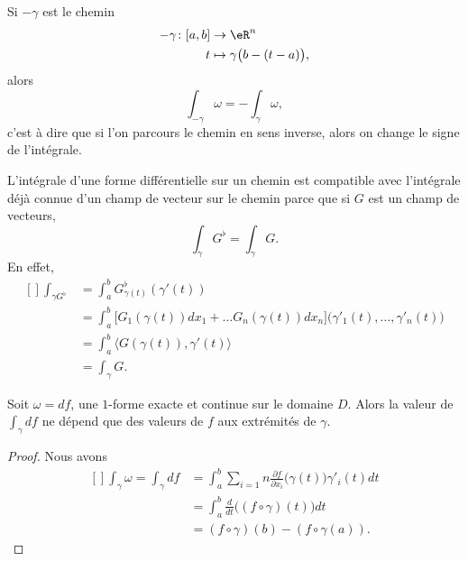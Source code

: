 \begin{remark}
	Si $-\gamma$ est le chemin
	\begin{equation}
		\begin{aligned}
			- \gamma\colon [a,b]&\to \eR^n \\
			t&\mapsto \gamma\big( b-(t-a) \big),
		\end{aligned}
	\end{equation}
	alors
	\begin{equation}
		\int_{-\gamma}\omega=-\int_{\gamma}\omega,
	\end{equation}
	c'est à dire que si l'on parcours le chemin en sens inverse, alors on change le signe de l'intégrale.
\end{remark}

L'intégrale d'une forme différentielle sur un chemin est compatible avec l'intégrale déjà connue d'un champ de vecteur sur le chemin parce que si $G$ est un champ de vecteurs,
\begin{equation}
	\int_{\gamma}G^{\flat}=\int_{\gamma}G.
\end{equation}
En effet,
\begin{equation}
	\begin{aligned}[]
		\int_{\gamma G^{\flat}}	&=\int_a^b G_{\gamma(t)}^{\flat}(\gamma'(t))\\
					&=\int_a^b\big[ G_1( \gamma(t) )dx_1+\ldots G_n(\gamma(t))dx_n \big]\big( \gamma'_1(t),\ldots,\gamma'_n(t) \big)\\
					&=\int_{a}^b\langle G(\gamma(t)), \gamma'(t)\rangle \\
					&=\int_{\gamma}G.
	\end{aligned}
\end{equation}


\begin{proposition}
	Soit $\omega=df$, une $1$-forme exacte et continue sur le domaine $D$. Alors la valeur de $\int_{\gamma}df$ ne dépend que des valeurs de $f$ aux extrémités de $\gamma$.
\end{proposition}

\begin{proof}
	Nous avons
	\begin{equation}
		\begin{aligned}[]
			\int_{\gamma}\omega=\int_{\gamma}df&=\int_{a}^b\sum_{i=1}n\frac{ \partial f }{ \partial x_i }\big( \gamma(t) \big)\gamma'_i(t)dt\\
				&=\int_a^b\frac{ d }{ dt }\Big( (f\circ\gamma)(t) \Big)dt\\
				&=(f\circ\gamma)(b)-(f\circ\gamma(a)).
		\end{aligned}
	\end{equation}
\end{proof}

